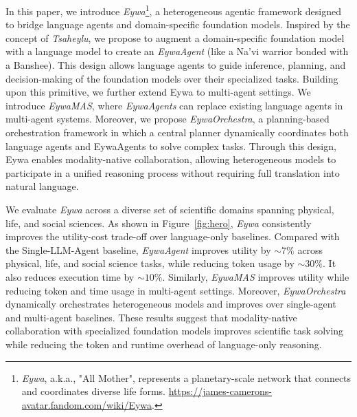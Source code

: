 In this paper, we introduce \textit{Eywa}\footnote{\textit{Eywa}, a.k.a., "All Mother", represents a planetary-scale network that connects and coordinates diverse life forms. \url{https://james-camerons-avatar.fandom.com/wiki/Eywa}.}, a heterogeneous agentic framework designed to bridge language agents and domain-specific foundation models.
Inspired by the concept of \textit{Tsaheylu}, we propose to augment a domain-specific foundation model with a language model to create an \textit{EywaAgent} (like a Na'vi warrior bonded with a Banshee). This design allows language agents to guide inference, planning, and decision-making of the foundation models over their specialized tasks.
Building upon this primitive, we further extend Eywa to multi-agent settings. 
We introduce \textit{EywaMAS}, where \textit{EywaAgents} can replace existing language agents in multi-agent systems. 
Moreover, we propose \textit{EywaOrchestra}, a planning-based orchestration framework in which a central planner dynamically coordinates both language agents and EywaAgents to solve complex tasks. 
Through this design, Eywa enables modality-native collaboration, allowing heterogeneous models to participate in a unified reasoning process without requiring full translation into natural language.

We evaluate \textit{Eywa} across a diverse set of scientific domains spanning physical, life, and social sciences.
As shown in Figure~\ref{fig:hero}, \textit{Eywa} consistently improves the utility-cost trade-off over language-only baselines. 
Compared with the Single-LLM-Agent baseline, \textit{EywaAgent} improves utility by $\sim7\%$ across physical, life, and social science tasks, while reducing token usage by $\sim30\%$.
It also reduces execution time by $\sim10\%$.
Similarly, \textit{EywaMAS} improves utility while reducing token and time usage in multi-agent settings. Moreover, \textit{EywaOrchestra} dynamically orchestrates heterogeneous models and improves over single-agent and multi-agent baselines.
These results suggest that modality-native collaboration with specialized foundation models improves scientific task solving while reducing the token and runtime overhead of language-only reasoning. 